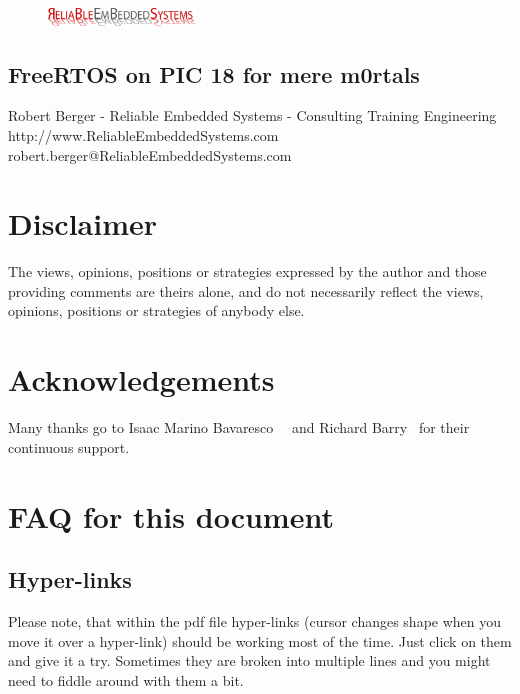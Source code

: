 \documentclass[a4paper,11pt]{article}
\begin{document}
\thispagestyle{empty} %

\begin{figure}
 \begin{center}
  \includegraphics[width=0.35\textwidth]{res-logo-mirror}
 \end{center}
\end{figure}

\begin{center}
\section*{FreeRTOS on PIC 18 for mere m0rtals}
Robert Berger - Reliable Embedded Systems - Consulting Training Engineering \\http://www.ReliableEmbeddedSystems.com\\ robert.berger@ReliableEmbeddedSystems.com
\end{center}

\section{Disclaimer}
The views, opinions, positions or strategies expressed by the author and those
providing comments are theirs alone, and do not necessarily reflect the views,
opinions, positions or strategies of anybody else.

\section{Acknowledgements}
Many thanks go to Isaac Marino Bavaresco~\cite{isaac-site}~\cite{piclist-site}
and Richard Barry~\cite{freertos-site} for their continuous support.

\section{FAQ for this document}
\subsection{Hyper-links}
Please note, that within the pdf file hyper-links (cursor changes shape when you
move it over a hyper-link) should be working most of the time. Just click on them
and give it a try. Sometimes they are broken into multiple lines and you might
need to fiddle around with them a bit.
\end{document}
